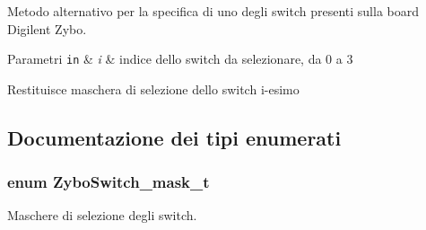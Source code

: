 Metodo alternativo per la specifica di uno degli switch presenti sulla board Digilent Zybo. 


\begin{DoxyParams}[1]{Parametri}
\mbox{\tt in}  & {\em i} & indice dello switch da selezionare, da 0 a 3 \\
\hline
\end{DoxyParams}
\begin{DoxyReturn}{Restituisce}
maschera di selezione dello switch i-\/esimo 
\end{DoxyReturn}


\subsection{Documentazione dei tipi enumerati}
\hypertarget{group___switch_ga2e0602a824354f25c395f938caba3703}{
\subsubsection[{Zybo\+Switch\+\_\+mask\+\_\+t}]{\setlength{\rightskip}{0pt plus 5cm}enum {\bf Zybo\+Switch\+\_\+mask\+\_\+t}}}\label{group___switch_ga2e0602a824354f25c395f938caba3703}


Maschere di selezione degli switch. 

